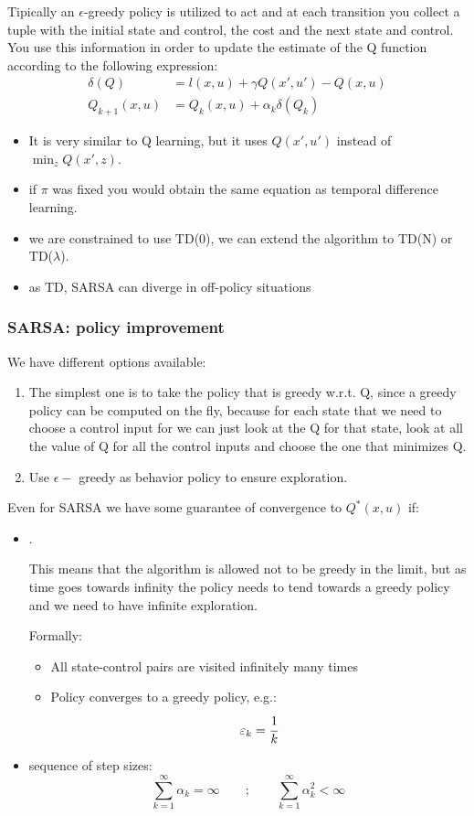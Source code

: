 Tipically an $\epsilon$-greedy policy is utilized to act and at each transition you collect a tuple with the initial state and control, the cost and the next state and control. You use this information in order to update the estimate of the Q function according to the following expression:
\begin{align*}
\delta(Q) &= l(x,u) + \gamma Q(x',u') - Q(x,u)\\
Q_{k+1}(x,u) &= Q_k(x,u) + \alpha_k\delta(Q_k)
\end{align*}

\begin{itemize}
\item It is very similar to Q learning, but it uses $Q(x',u')$ instead of $\min_{z} Q(x', z)$.
\item if $\pi$ was fixed you would obtain the same equation as temporal difference learning.
\item we are constrained to use TD(0), we can extend the algorithm to TD(N) or TD($\lambda$).
\item as TD, SARSA can diverge in off-policy situations
\end{itemize}


\subsubsection{SARSA: policy improvement}
We have different options available:
\begin{enumerate}
\item The simplest one is to take the policy that is greedy w.r.t. Q, since a greedy policy can be computed on the fly, because for each state that we need to choose a control input for we can just look at the Q for that state, look at all the value of Q for all the control inputs and choose the one that minimizes Q.
\item Use $\epsilon-$ greedy as behavior policy to ensure exploration.
\end{enumerate}

Even for SARSA we have some guarantee of convergence to $Q^*(x,u)$ if:
\begin{itemize}
\item {}.

This means that the algorithm is allowed not to be greedy in the limit, but as time goes towards infinity the policy needs to tend towards a greedy policy and we need to have infinite exploration.

Formally:
\begin{itemize}
\item All state-control pairs are visited infinitely many times
\item Policy converges to a greedy policy, e.g.:
\[\epsilon_k = \cfrac{1}{k}\]
\end{itemize}
\item {} sequence of step sizes:
\[\sum_{k=1}^{\infty} \alpha_k = \infty \qquad;\qquad \sum_{k=1}^{\infty} \alpha_k^2 < \infty\]
\end{itemize}

